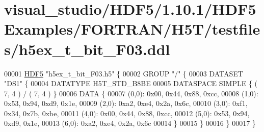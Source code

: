 \hypertarget{visual__studio_2_h_d_f5_21_810_81_2_h_d_f5_examples_2_f_o_r_t_r_a_n_2_h5_t_2testfiles_2h5ex__t__bit___f03_8ddl_source}{}\section{visual\+\_\+studio/\+H\+D\+F5/1.10.1/\+H\+D\+F5\+Examples/\+F\+O\+R\+T\+R\+A\+N/\+H5\+T/testfiles/h5ex\+\_\+t\+\_\+bit\+\_\+\+F03.ddl}
\label{visual__studio_2_h_d_f5_21_810_81_2_h_d_f5_examples_2_f_o_r_t_r_a_n_2_h5_t_2testfiles_2h5ex__t__bit___f03_8ddl_source}

\begin{DoxyCode}
00001 \hyperlink{namespace_h_d_f5}{HDF5} \textcolor{stringliteral}{"h5ex\_t\_bit\_F03.h5"} \{
00002 GROUP \textcolor{stringliteral}{"/"} \{
00003    DATASET \textcolor{stringliteral}{"DS1"} \{
00004       DATATYPE  H5T\_STD\_B8BE
00005       DATASPACE  SIMPLE \{ ( 7, 4 ) / ( 7, 4 ) \}
00006       DATA \{
00007       (0,0): 0x00, 0x44, 0x88, 0xcc,
00008       (1,0): 0x53, 0x94, 0xd9, 0x1e,
00009       (2,0): 0xa2, 0xe4, 0x2a, 0x6c,
00010       (3,0): 0xf1, 0x34, 0x7b, 0xbe,
00011       (4,0): 0x00, 0x44, 0x88, 0xcc,
00012       (5,0): 0x53, 0x94, 0xd9, 0x1e,
00013       (6,0): 0xa2, 0xe4, 0x2a, 0x6c
00014       \}
00015    \}
00016 \}
00017 \}
\end{DoxyCode}
